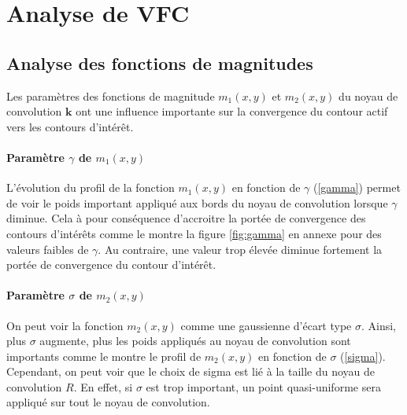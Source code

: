 
\section{Analyse de VFC}
\subsection{Analyse des fonctions de magnitudes}
Les paramètres des fonctions de magnitude $m_1(x,y)$ et $m_2(x,y)$ du noyau de convolution $\mathbf{k}$ ont une influence importante sur la convergence du contour actif vers les contours d'intérêt.

\paragraph*{Paramètre $\gamma$ de $m_1(x,y)$}
L'évolution du profil de la fonction $m_1(x,y)$ en fonction de $\gamma$ (\ref{gamma}) permet de voir le poids important appliqué aux bords du noyau de convolution lorsque $\gamma$ diminue. Cela à pour conséquence d'accroitre la portée de convergence des contours d'intérêts comme le montre la figure \ref{fig:gamma} en annexe pour des valeurs faibles de $\gamma$. Au contraire, une valeur trop élevée diminue fortement la portée de convergence du contour d'intérêt. 

\paragraph*{Paramètre $\sigma$ de $m_2(x,y)$}
On peut voir la fonction $m_2(x,y)$ comme une gaussienne d'écart type $\sigma$. Ainsi, plus $\sigma$ augmente, plus les poids appliqués au noyau de convolution sont importants comme le montre le profil de $m_2(x,y)$ en fonction de $\sigma$ (\ref{sigma}). Cependant, on peut voir que le choix de sigma est lié à la taille du noyau de convolution $R$. En effet, si $\sigma$ est trop important, un point quasi-uniforme sera appliqué sur tout le noyau de convolution. 

